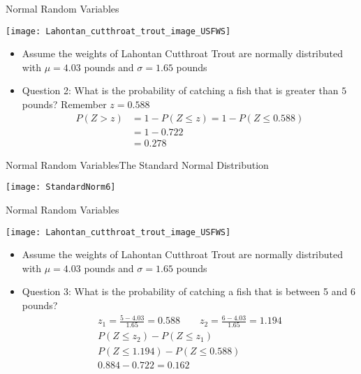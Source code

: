 \documentclass[xcolor=dvipsnames]{beamer}
\begin{document}
\begin{frame}{Normal Random Variables}
	\begin{center}
		\texttt{[image: Lahontan\_cutthroat\_trout\_image\_USFWS]}
	\end{center}
	\begin{itemize}
		\item Assume the weights of Lahontan Cutthroat Trout are normally distributed with $\mu = 4.03$ pounds and $\sigma = 1.65$ pounds 
		\item Question 2: What is the probability of catching a fish that is greater than $5$ pounds? Remember $z = 0.588$ \pause
		\begin{align*}
		P(Z > z) &= 1 - P(Z \leq z) = 1 - P(Z \leq 0.588)\\
		&= 1 - 0.722 \\
		&= 0.278
		\end{align*}
	\end{itemize}
\end{frame}

\begin{frame}{Normal Random Variables}{The Standard Normal Distribution}
	\begin{center}
		\texttt{[image: StandardNorm6]}
	\end{center}
\end{frame}

\begin{frame}{Normal Random Variables}
	\begin{center}
		\texttt{[image: Lahontan\_cutthroat\_trout\_image\_USFWS]}
	\end{center}
	\begin{itemize}
		\item Assume the weights of Lahontan Cutthroat Trout are normally distributed with $\mu = 4.03$ pounds and $\sigma = 1.65$ pounds
		\item Question 3: What is the probability of catching a fish that is between 5 and 6 pounds? \pause
		\begin{gather*}
		z_1 = \frac{5-4.03}{1.65} = 0.588 \quad \quad z_2 = \frac{6-4.03}{1.65} = 1.194\\
		P(Z \leq z_2) - P(Z \leq z_1) \\
		P(Z \leq 1.194) - P(Z \leq 0.588) \\
		0.884 - 0.722 =  0.162
		\end{gather*}
	\end{itemize}
\end{frame}
\end{document}
